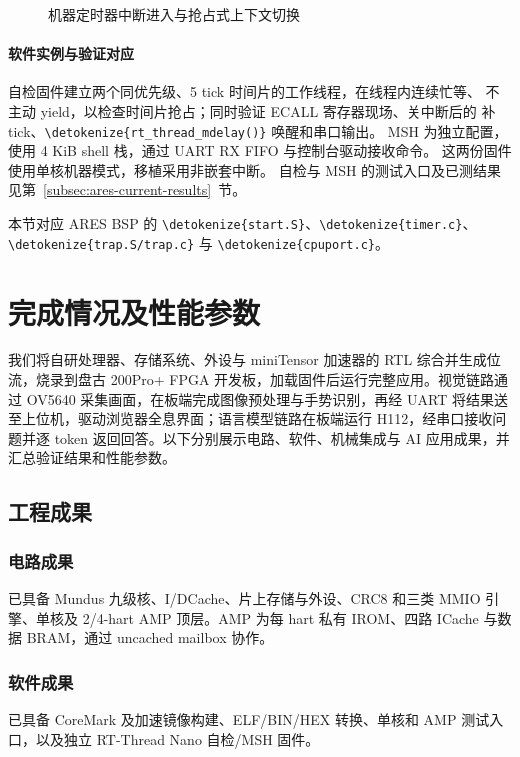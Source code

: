 \documentclass[UTF8,a4paper,12pt,fontset=none,scheme=plain]{ctexart}
\newcommand{\code}[1]{\texttt{\detokenize{#1}}}
\renewcommand{\code}[1]{{\small\ttfamily\urlstyle{tt}\expandafter\nolinkurl\expandafter{\detokenize{#1}}}}
\newcommand{\sub}[1]{{\color{aresGray}#1}}
\begin{document}
\begin{figure}[htbp]
\caption{机器定时器中断进入与抢占式上下文切换}
\label{fig:rtos-context-switch-flow}
\end{figure}

\paragraph{软件实例与验证对应}
自检固件建立两个同优先级、5 tick 时间片的工作线程，在线程内连续忙等、
不主动 yield，以检查时间片抢占；同时验证 ECALL 寄存器现场、关中断后的
补 tick、\code{rt_thread_mdelay()} 唤醒和串口输出。
MSH 为独立配置，使用 4 KiB shell 栈，通过 UART RX FIFO 与控制台驱动接收命令。
这两份固件使用单核机器模式，移植采用非嵌套中断。
自检与 MSH 的测试入口及已测结果见第~\ref{subsec:ares-current-results}~节。

本节对应 ARES BSP 的 \code{start.S}、\code{timer.c}、\code{trap.S/trap.c}
与 \code{cpuport.c}。


\clearpage
\section{完成情况及性能参数}
我们将自研处理器、存储系统、外设与 miniTensor 加速器的 RTL 综合并生成位流，烧录到盘古 200Pro+ FPGA 开发板，加载固件后运行完整应用。视觉链路通过 OV5640 采集画面，在板端完成图像预处理与手势识别，再经 UART 将结果送至上位机，驱动浏览器全息界面；语言模型链路在板端运行 H112，经串口接收问题并逐 token 返回回答。以下分别展示电路、软件、机械集成与 AI 应用成果，并汇总验证结果和性能参数。

\subsection{工程成果}
\subsubsection{电路成果}
已具备 Mundus 九级核、I/DCache、片上存储与外设、CRC8 和三类 MMIO 引擎、单核及 2/4-hart AMP 顶层。AMP 为每 hart 私有 IROM、四路 ICache 与数据 BRAM，通过 uncached mailbox 协作。
\subsubsection{软件成果}
已具备 CoreMark 及加速镜像构建、ELF/BIN/HEX 转换、单核和 AMP 测试入口，以及独立 RT-Thread Nano 自检/MSH 固件。
\end{document}
